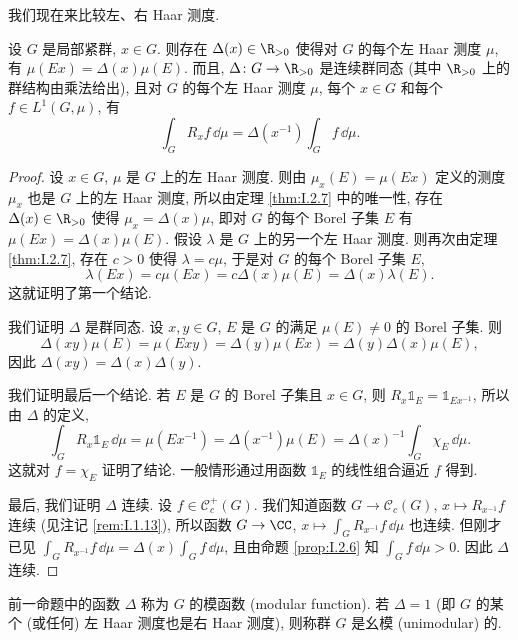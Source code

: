我们现在来比较左、右 Haar 测度.

\begin{proposition}
\label{prop:I.2.8}
设 $G$ 是局部紧群, $x \in G$. 则存在 $\Delta(x) \in \R_{>0}$ 使得对 $G$ 的每个左 Haar 测度 $\mu$, 有 $\mu(Ex) = \Delta(x)\mu(E)$. 而且, $\Delta \colon G \to \R_{>0}$ 是连续群同态 (其中 $\R_{>0}$ 上的群结构由乘法给出), 且对 $G$ 的每个左 Haar 测度 $\mu$, 每个 $x \in G$ 和每个 $f \in L^1(G, \mu)$, 有
\[
\int_G R_xf \,\dd\mu = \Delta(x^{-1})\int_G f \,\dd\mu.
\]
\end{proposition}

\begin{proof}
设 $x \in G$, $\mu$ 是 $G$ 上的左 Haar 测度. 则由 $\mu_x(E) = \mu(Ex)$ 定义的测度 $\mu_x$ 也是 $G$ 上的左 Haar 测度, 所以由定理 \ref{thm:I.2.7} 中的唯一性, 存在 $\Delta(x) \in \R_{>0}$ 使得 $\mu_x = \Delta(x)\mu$, 即对 $G$ 的每个 Borel 子集 $E$ 有 $\mu(Ex) = \Delta(x)\mu(E)$. 假设 $\lambda$ 是 $G$ 上的另一个左 Haar 测度. 则再次由定理 \ref{thm:I.2.7}, 存在 $c > 0$ 使得 $\lambda = c\mu$, 于是对 $G$ 的每个 Borel 子集 $E$,
\[
\lambda(Ex) = c\mu(Ex) = c\Delta(x)\mu(E) = \Delta(x)\lambda(E).
\]
这就证明了第一个结论.

我们证明 $\Delta$ 是群同态. 设 $x, y \in G$, $E$ 是 $G$ 的满足 $\mu(E) \neq 0$ 的 Borel 子集. 则
\[
\Delta(xy)\mu(E) = \mu(Exy) = \Delta(y)\mu(Ex) = \Delta(y)\Delta(x)\mu(E),
\]
因此 $\Delta(xy) = \Delta(x)\Delta(y)$.

我们证明最后一个结论. 若 $E$ 是 $G$ 的 Borel 子集且 $x \in G$, 则 $R_x\mathbb{1}_E = \mathbb{1}_{Ex^{-1}}$, 所以由 $\Delta$ 的定义,
\[
\int_G R_x\mathbb{1}_E \,\dd\mu = \mu(Ex^{-1}) = \Delta(x^{-1})\mu(E) = \Delta(x)^{-1}\int_G \chi_E \,\dd\mu.
\]
这就对 $f = \chi_E$ 证明了结论. 一般情形通过用函数 $\mathbb{1}_E$ 的线性组合逼近 $f$ 得到.

最后, 我们证明 $\Delta$ 连续. 设 $f \in \mathcal{C}_c^+(G)$. 我们知道函数 $G \to \mathcal{C}_c(G)$, $x \longmapsto R_{x^{-1}}f$ 连续 (见注记 \ref{rem:I.1.13}), 所以函数 $G \to \CC$, $x \longmapsto \int_G R_{x^{-1}}f \,\dd\mu$ 也连续. 但刚才已见 $\int_G R_{x^{-1}}f \,\dd\mu = \Delta(x)\int_G f \,\dd\mu$, 且由命题 \ref{prop:I.2.6} 知 $\int_G f \,\dd\mu > 0$. 因此 $\Delta$ 连续.
\end{proof}

\begin{definition}
\label{def:I.2.9}
前一命题中的函数 $\Delta$ 称为 $G$ 的模函数 (modular function). 若 $\Delta = 1$ (即 $G$ 的某个 (或任何) 左 Haar 测度也是右 Haar 测度), 则称群 $G$ 是幺模 (unimodular) 的.
\end{definition}

